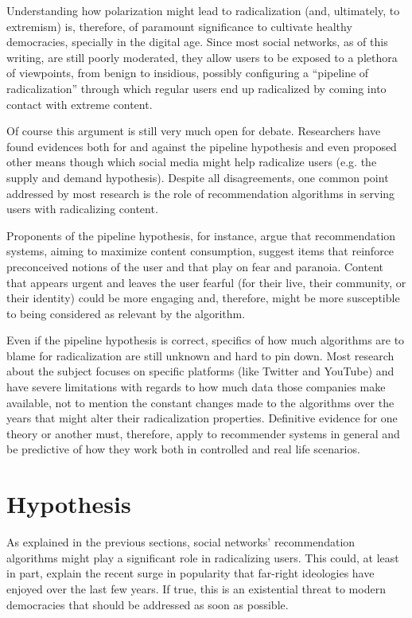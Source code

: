 Understanding how polarization might lead to radicalization (and, ultimately, to
extremism) is, therefore, of paramount significance to cultivate healthy
democracies, specially in the digital age. Since most social networks, as of
this writing, are still poorly moderated, they allow users to be exposed to a
plethora of viewpoints, from benign to insidious, possibly configuring a
``pipeline of radicalization'' through which regular users end up radicalized by
coming into contact with extreme content.

Of course this argument is still very much open for debate. Researchers have
found evidences both for and against the pipeline hypothesis and even proposed
other means though which social media might help radicalize users (e.g. the supply
and demand hypothesis). Despite all disagreements, one common point addressed by
most research is the role of recommendation algorithms in serving users with
radicalizing content.

Proponents of the pipeline hypothesis, for instance, argue that recommendation
systems, aiming to maximize content consumption, suggest items that reinforce
preconceived notions of the user and that play on fear and paranoia. Content
that appears urgent and leaves the user fearful (for their live, their
community, or their identity) could be more engaging and, therefore, might be
more susceptible to being considered as relevant by the algorithm.

Even if the pipeline hypothesis is correct, specifics of how much algorithms are
to blame for radicalization are still unknown and hard to pin down. Most
research about the subject focuses on specific platforms (like Twitter and
YouTube) and have severe limitations with regards to how much data those
companies make available, not to mention the constant changes made to the
algorithms over the years that might alter their radicalization properties.
Definitive evidence for one theory or another must, therefore, apply to
recommender systems in general and be predictive of how they work both in
controlled and real life scenarios.

\section{Hypothesis}
\label{sec:hypothesis}

As explained in the previous sections, social networks' recommendation
algorithms might play a significant role in radicalizing users. This could, at
least in part, explain the recent surge in popularity that far-right ideologies
have enjoyed over the last few years. If true, this is an existential threat to
modern democracies that should be addressed as soon as possible.

